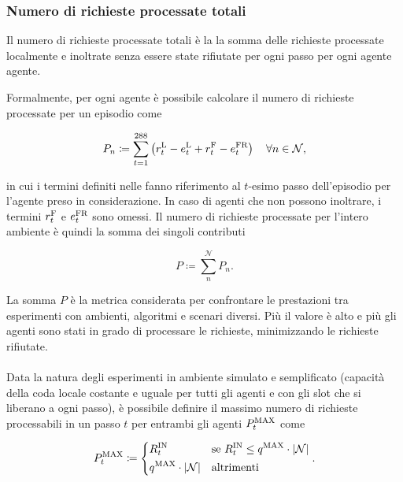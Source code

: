 \subsubsection{Numero di richieste processate totali}

Il numero di richieste processate totali è la la somma delle richieste processate localmente e inoltrate senza essere state rifiutate per ogni passo per ogni agente agente.

Formalmente, per ogni agente è possibile calcolare il numero di richieste processate per un episodio come

\begin{equation}
    P_n \coloneqq \sum_{t=1}^{288} \left( r^\textnormal{L}_t - e^\textnormal{L}_t + r^\textnormal{F}_t - e^\textnormal{FR}_t \right) \quad \forall n \in \mathcal{N},
\end{equation}

in cui i termini definiti nelle  fanno riferimento al $t$-esimo passo dell'episodio per l'agente preso in considerazione. In caso di agenti che non possono inoltrare, i termini $r^\textnormal{F}_t$ e $e^\textnormal{FR}_t$ sono omessi. Il numero di richieste processate per l'intero ambiente è quindi la somma dei singoli contributi

\begin{equation}
    P \coloneqq \sum_{n}^{\mathcal{N}} P_n.
\end{equation}

La somma $P$ è la metrica considerata per confrontare le prestazioni tra esperimenti con ambienti, algoritmi e scenari diversi. Più il valore è alto e più gli agenti sono stati in grado di processare le richieste, minimizzando le richieste rifiutate.

\paragraph{} Data la natura degli esperimenti in ambiente simulato e semplificato (capacità della coda locale costante e uguale per tutti gli agenti e con gli slot che si liberano a ogni passo), è possibile definire il massimo numero di richieste processabili in un passo $t$ per entrambi gli agenti $P^\textnormal{MAX}_t$ come

\begin{equation}
    P^\textnormal{MAX}_t \coloneqq \begin{dcases}
        R^\textnormal{IN}_t & \textnormal{se } R^\textnormal{IN}_t \le q^\textnormal{MAX} \cdot |\mathcal{N}| \\
        q^\textnormal{MAX} \cdot |\mathcal{N}| & \textnormal{altrimenti}
    \end{dcases}.
\end{equation}


